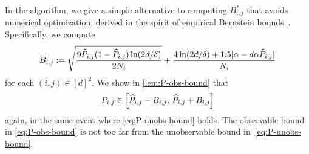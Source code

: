 In the algorithm, we give a simple alternative to computing
$B_{i,j}^*$ that avoids numerical optimization, derived in the spirit
of empirical Bernstein bounds~\citep{audibert2009}.
Specifically, we compute
\begin{equation}
  B_{i,j} :=
  \sqrt{\frac{9\widehat{P}_{i,j}(1-\widehat{P}_{i,j})\ln(2d/\delta)}{2N_i}}
  + \frac{4\ln(2d/\delta)+1.5|\alpha-d\alpha\widehat{P}_{i,j}|}{N_i}
  \label{eq:P-obs-bound}
\end{equation}
for each $(i,j) \in [d]^2$.
We show in \cref{lem:P-obs-bound} that
\[
  P_{i,j} \in
  \left[
    \widehat{P}_{i,j} - B_{i,j},\,
    \widehat{P}_{i,j} + B_{i,j}
  \right]
\]
again, in the same event where \cref{eq:P-unobs-bound} holds.
The observable bound in \cref{eq:P-obs-bound} is not too far from the
unobservable bound in~\cref{eq:P-unobs-bound}.

